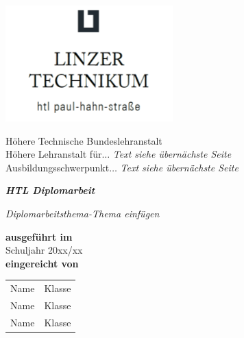

\begin{titlepage}

\begin{center}

\includegraphics[scale=0.95]{assets/litec-logo-center.png}

\vspace{0.5cm}

{
\Large
\begin{spacing}{1.5}
Höhere Technische Bundeslehranstalt\\
Höhere Lehranstalt für$\ldots$ \textit{Text siehe übernächste Seite}\\
Ausbildungsschwerpunkt$\ldots$ \textit{Text siehe übernächste Seite}
\end{spacing}
}

\vspace{1cm}

{
\Huge
\color{litec-blue}
\textbf{\textit{HTL Diplomarbeit}}
}

\vspace{1.2cm}

{
\Huge
\textit{Diplomarbeitsthema-Thema einfügen}
}

\vspace{1cm}

\begin{spacing}{3}
\textbf{ausgeführt im}\\
{
\Huge
\color{litec-blue}
Schuljahr 20xx/xx
}\\
\textbf{eingereicht von}
\end{spacing}

\vspace{-0.5cm}

\begin{spacing}{1.5}
\hfill
\begin{minipage}{\dimexpr\textwidth-5cm}
\Large
\begin{tabular}{l@{\hskip 4cm}l}
Name & Klasse \\
Name & Klasse \\
Name & Klasse
\end{tabular}
\xdef\tpd{\the\prevdepth}
\end{minipage}
\end{spacing}
\prevdepth\tpd


\end{center}
\end{titlepage}
